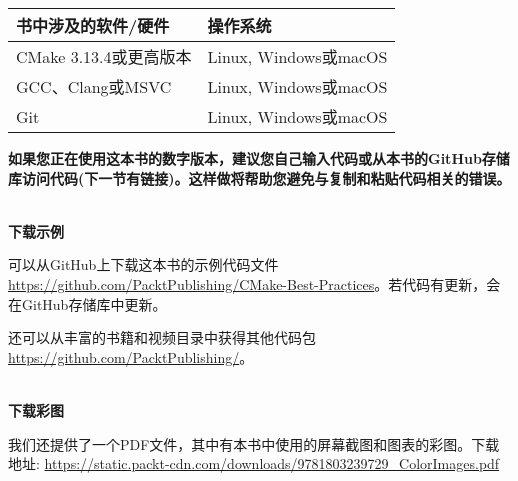 \begin{table}[H]
	\centering
	\begin{tabular}{|l|l|}
		\hline
		书中涉及的软件/硬件                                                                                                                  & 操作系统                                                             \\ \hline
		CMake 3.13.4或更高版本                                                                                                                                  &                                                                           Linux, Windows或macOS       \\  \hline
		GCC、Clang或MSVC              &                                                                                  Linux, Windows或macOS\\  \hline
		Git  &  Linux, Windows或macOS                                                                                \\ \hline
	\end{tabular}
\end{table}

\textbf{如果您正在使用这本书的数字版本，建议您自己输入代码或从本书的GitHub存储库访问代码(下一节有链接)。这样做将帮助您避免与复制和粘贴代码相关的错误。}

\hspace*{\fill} \\ %
\textbf{下载示例}

可以从GitHub上下载这本书的示例代码文件\url{https://github.com/PacktPublishing/CMake-Best-Practices}。若代码有更新，会在GitHub存储库中更新。

还可以从丰富的书籍和视频目录中获得其他代码包\url{https://github.com/PacktPublishing/}。

\hspace*{\fill} \\ %
\textbf{下载彩图}

我们还提供了一个PDF文件，其中有本书中使用的屏幕截图和图表的彩图。下载地址: \url{https://static.packt-cdn.com/downloads/9781803239729_ColorImages.pdf}






















